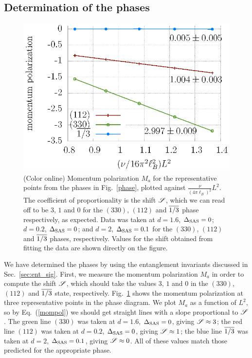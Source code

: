 \subsection{Determination of the phases}\label{sec:determination}

\begin{figure}[ttt]
	\includegraphics[width=0.6\linewidth]{figures/mompol.eps}
	\caption{(Color online)
		Momentum polarization $M_a$ for the representative points from the phases in Fig.~\ref{phase}, plotted against $\frac{\nu}{(4\pi\ell_B)^2}L^2$.
		The coefficient of proportionality is the shift $\mathscr{S}$, which we can read off to be $3$, $1$ and $0$ for the $(330)$, $(112)$ and $\overline{1/3}$ phase respectively, as expected.
		Data was taken at $d=1.6$, $\Delta_\textrm{SAS}=0$; $d=0.2$, $\Delta_\textrm{SAS}=0$; and $d=2$, $\Delta_\textrm{SAS}=0.1$ for the $(330)$, $(112)$ and $\overline{1/3}$ phases, respectively. Values for the shift obtained from fitting the data are shown directly on the figure.
	}
	\label{mompolfig}
\end{figure}
We have determined the phases by using the entanglement invariants discussed in Sec.~\ref{sec:ent_sig}.
First, we measure the momentum polarization $M_a$  in order to compute the shift $\mathscr{S}$, which should take the values $3$, $1$ and $0$ in the $(330)$, $(112)$ and $\overline{1/3}$ state, respectively. 
Fig.~\ref{mompolfig} shows the momentum polarization at three representative points in the phase diagram.
We plot $M_a$  as a function of $L^2$, so by Eq.~(\ref{mompol}) we should get straight lines with a slope proportional to $\mathscr{S}$.
The green line $(330)$ was taken at $d=1.6$, $\Delta_\textrm{SAS}=0$, giving $\mathscr{S} \approx 3$;
the red line $(112)$ was taken at $d=0.2$, $\Delta_\textrm{SAS}=0$, giving $\mathscr{S} \approx 1$;
the blue line $\overline{1/3}$ was taken at $d=2$, $\Delta_\textrm{SAS}=0.1$, giving $\mathscr{S} \approx 0$.
All of these values match those predicted for the appropriate phase.

